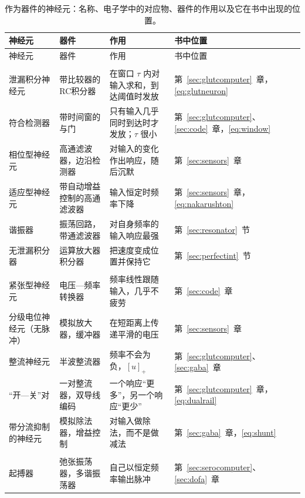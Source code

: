 \begin{center}
\footnotesize
\setlength{\tabcolsep}{3pt}
\renewcommand{\arraystretch}{1.15}
\begin{longtable}{>{\raggedright}p{3.1cm}>{\raggedright}p{3.3cm}>{\raggedright}p{4.7cm}>{\raggedright\arraybackslash}p{2.4cm}}
\caption{作为器件的神经元：名称、电子学中的对应物、器件的作用以及它在书中出现的位置。}\label{tab:eetypes}\\
\toprule
神经元 & 器件 & 作用 & 书中位置 \\
\midrule
\endfirsthead
\toprule
神经元 & 器件 & 作用 & 书中位置 \\
\midrule
\endhead
\bottomrule
\endfoot
\multicolumn{4}{l}{\emph{滤波器和积分器}} \\
泄漏积分神经元 & 带比较器的RC积分器 & 在窗口 $\tau$ 内对输入求和，到达阈值时发放 & 第~\ref{sec:glutcomputer}~章，\eqref{eq:glutneuron} \\
符合检测器 & 带时间窗的与门 & 只有输入几乎同时到达时才发放；$\tau$ 很小 & 第~\ref{sec:glutcomputer}、\ref{sec:code}~章，\eqref{eq:window} \\
相位型神经元 & 高通滤波器，边沿检测器 & 对输入的变化作出响应，随后沉默 & 第~\ref{sec:sensors}~章 \\
适应型神经元 & 带自动增益控制的高通滤波器 & 输入恒定时频率下降 & 第~\ref{sec:sensors}~章，\eqref{eq:nakarushton} \\
谐振器 & 振荡回路，带通滤波器 & 对自身频率的输入响应最强 & 第~\ref{sec:resonator}~节 \\
无泄漏积分器 & 运算放大器积分器 & 把速度变成位置并保持它 & 第~\ref{sec:perfectint}~节 \\
\midrule
\multicolumn{4}{l}{\emph{转换器}} \\
紧张型神经元 & 电压—频率转换器 & 频率线性跟随输入，几乎不疲劳 & 第~\ref{sec:code}~章 \\
分级电位神经元（无脉冲） & 模拟放大器，缓冲器 & 在短距离上传递平滑的电压 & 第~\ref{sec:sensors}~章 \\
整流神经元 & 半波整流器 & 频率不会为负，$[u]_+$ & 第~\ref{sec:glutcomputer}、\ref{sec:gaba}~章 \\
“开—关”对 & 一对整流器，双导线编码 & 一个响应“更多”，另一个响应“更少” & 第~\ref{sec:glutcomputer}~章，\eqref{eq:dualrail} \\
带分流抑制的神经元 & 模拟除法器，增益控制 & 对输入做除法，而不是做减法 & 第~\ref{sec:gaba}~章，\eqref{eq:shunt} \\
\midrule
\multicolumn{4}{l}{\emph{振荡器与时间}} \\
起搏器 & 弛张振荡器，多谐振荡器 & 自己以恒定频率输出脉冲 & 第~\ref{sec:serocomputer}、\ref{sec:dofa}~章 \\

\end{longtable}
\end{center}
